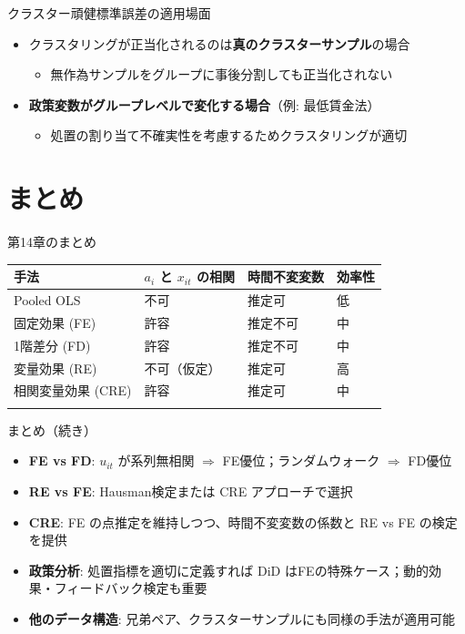 \documentclass[
  ignorenonframetext,
]{beamer}
\providecommand{\tightlist}{%
  \setlength{\itemsep}{0pt}\setlength{\parskip}{0pt}}
\begin{document}
\begin{frame}{クラスター頑健標準誤差の適用場面}
\label{ux30afux30e9ux30b9ux30bfux30fcux9811ux5065ux6a19ux6e96ux8aa4ux5deeux306eux9069ux7528ux5834ux9762}
\begin{itemize}
\tightlist
\item
  クラスタリングが正当化されるのは\textbf{真のクラスターサンプル}の場合

  \begin{itemize}
  \tightlist
  \item
    無作為サンプルをグループに事後分割しても正当化されない
  \end{itemize}
\item
  \textbf{政策変数がグループレベルで変化する場合}（例: 最低賃金法）

  \begin{itemize}
  \tightlist
  \item
    処置の割り当て不確実性を考慮するためクラスタリングが適切
  \end{itemize}
\end{itemize}
\end{frame}

\section{まとめ}\label{ux307eux3068ux3081}

\begin{frame}{第14章のまとめ}
\label{ux7b2c14ux7ae0ux306eux307eux3068ux3081}
\begin{longtable}[]{@{}llll@{}}
\toprule\noalign{}
手法 & \(a_i\) と \(x_{it}\) の相関 & 時間不変変数 & 効率性 \\
\midrule\noalign{}
\endhead
Pooled OLS & 不可 & 推定可 & 低 \\
固定効果 (FE) & 許容 & 推定不可 & 中 \\
1階差分 (FD) & 許容 & 推定不可 & 中 \\
変量効果 (RE) & 不可（仮定） & 推定可 & 高 \\
相関変量効果 (CRE) & 許容 & 推定可 & 中 \\
\bottomrule\noalign{}
\end{longtable}
\end{frame}

\begin{frame}{まとめ（続き）}
\label{ux307eux3068ux3081ux7d9aux304d}
\begin{itemize}
\tightlist
\item
  \textbf{FE vs FD}: \(u_{it}\) が系列無相関 \(\Rightarrow\)
  FE優位；ランダムウォーク \(\Rightarrow\) FD優位
\item
  \textbf{RE vs FE}: Hausman検定または CRE アプローチで選択
\item
  \textbf{CRE}: FE の点推定を維持しつつ、時間不変変数の係数と RE vs FE
  の検定を提供
\item
  \textbf{政策分析}: 処置指標を適切に定義すれば DiD
  はFEの特殊ケース；動的効果・フィードバック検定も重要
\item
  \textbf{他のデータ構造}:
  兄弟ペア、クラスターサンプルにも同様の手法が適用可能
\end{itemize}
\end{frame}
\end{document}
